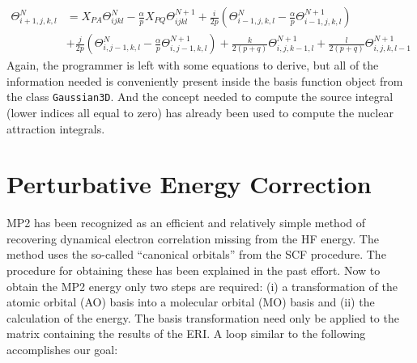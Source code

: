 \documentclass[12pt]{article}
\begin{document}
\begin{align*}
\Theta_{i+1,j,k,l}^N &= X_{PA}\Theta_{ijkl}^N - \frac{\alpha}{p}X_{PQ}
\Theta_{ijkl}^{N+1} + \frac{i}{2p}\left( \Theta_{i-1,j,k,l}^N - \frac{\alpha}{p}
\Theta_{i-1,j,k,l}^{N+1} \right) \\
&+ \frac{j}{2p} \left( \Theta_{i,j-1,k,l}^N - \frac {\alpha}{p}\Theta_{i,j-1,k,l}^{N+1} \right)
+ \frac{k}{2(p+q)}\Theta_{i,j,k-1,l}^{N+1} + \frac{l}{2(p+q)}\Theta_{i,j,k,l-1}^{N+1}
\end{align*}
\noindent
Again, the programmer is left with some equations to derive, but all of the information needed
is conveniently present inside the basis function object from the class {\tt Gaussian3D}.
And the concept needed to compute the source integral (lower indices all
equal to zero) has already been used to compute the nuclear attraction integrals.

\section{Perturbative Energy Correction}
MP2 has been recognized as an efficient and relatively simple method of recovering 
dynamical electron correlation missing from the HF energy. The method uses
the so-called ``canonical orbitals'' from the SCF procedure. The procedure for
obtaining these has been explained in the past effort. Now to obtain the MP2
energy only two steps are required: (i) a transformation of the atomic orbital (AO)
basis into a molecular orbital (MO) basis and (ii) the calculation of the energy.
The basis transformation need only be applied to the matrix containing the
results of the ERI. A loop similar to the following accomplishes our goal:

\\
\end{document}
